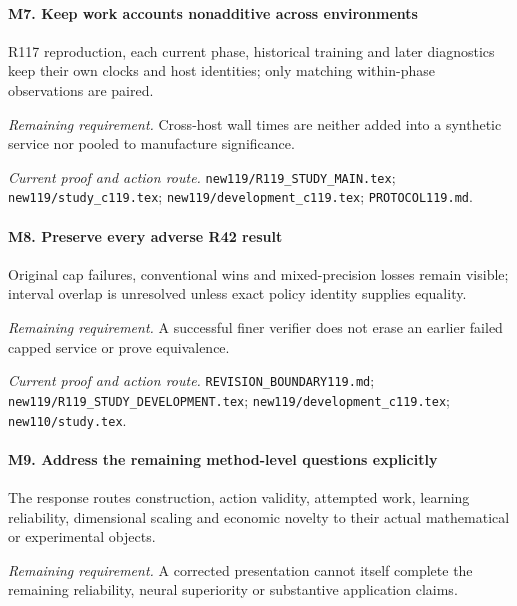 \paragraph{M7. Keep work accounts nonadditive across environments}

R117 reproduction, each current phase, historical training and later diagnostics keep their own clocks and host identities; only matching within-phase observations are paired.

\par\emph{Remaining requirement.} Cross-host wall times are neither added into a synthetic service nor pooled to manufacture significance.

\par\emph{Current proof and action route.} \nolinkurl{new119/R119_STUDY_MAIN.tex}; \nolinkurl{new119/study_c119.tex}; \nolinkurl{new119/development_c119.tex}; \nolinkurl{PROTOCOL119.md}.

\paragraph{M8. Preserve every adverse R42 result}

Original cap failures, conventional wins and mixed-precision losses remain visible; interval overlap is unresolved unless exact policy identity supplies equality.

\par\emph{Remaining requirement.} A successful finer verifier does not erase an earlier failed capped service or prove equivalence.

\par\emph{Current proof and action route.} \nolinkurl{REVISION_BOUNDARY119.md}; \nolinkurl{new119/R119_STUDY_DEVELOPMENT.tex}; \nolinkurl{new119/development_c119.tex}; \nolinkurl{new110/study.tex}.

\paragraph{M9. Address the remaining method-level questions explicitly}

The response routes construction, action validity, attempted work, learning reliability, dimensional scaling and economic novelty to their actual mathematical or experimental objects.

\par\emph{Remaining requirement.} A corrected presentation cannot itself complete the remaining reliability, neural superiority or substantive application claims.

